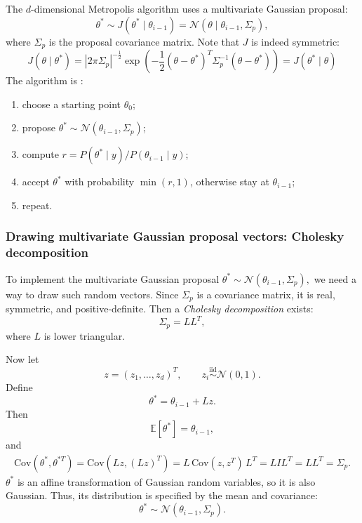\documentclass[11pt, titlepage]{article} %
\numberwithin{equation}{section}
\theoremstyle{definition}
\numberwithin{assumption}{section}
\begin{document}
The \(d\)-dimensional Metropolis algorithm uses a multivariate Gaussian proposal:
\begin{equation*}
    \theta^* \sim J(\theta^*\mid\theta_{i-1})= \mathcal{N}(\theta\mid\theta_{i-1},\Sigma_p),
\end{equation*}
where $\Sigma_p$ is the proposal covariance matrix. 
Note that $J$ is indeed symmetric:
\begin{equation*}
    J(\theta\mid\theta^*)=|2\pi\Sigma_p|^{-\frac{1}{2}}\exp\left(-\frac{1}{2}(\theta-\theta^*)^T\Sigma_p^{-1}(\theta-\theta^*)\right)= J(\theta^*\mid\theta)
\end{equation*}
The algorithm is :
\begin{enumerate}
    \item choose a starting point $\theta_0$;
    \item propose $\theta^*\sim \mathcal{N}(\theta_{i-1},\Sigma_p)$;
    \item compute $r=P(\theta^*\mid y)/P(\theta_{i-1}\mid y)$;
    \item accept $\theta^*$ with probability $\min(r,1)$, otherwise stay at $\theta_{i-1}$;
    \item repeat.
\end{enumerate}


\subsubsection*{Drawing multivariate Gaussian proposal vectors: Cholesky decomposition}

To implement the multivariate Gaussian proposal
$\theta^* \sim \mathcal{N}(\theta_{i-1},\Sigma_p),$
we need a way to draw such random vectors. Since $\Sigma_p$ is a covariance matrix, it is
real, symmetric, and positive-definite. Then a \textit{Cholesky decomposition} exists:
\begin{equation*}
    \Sigma_p=LL^T,
\end{equation*}
where $L$ is lower triangular.

Now let
\begin{equation*}
    z=(z_1,\dots,z_d)^T,
    \qquad
    z_i \overset{\mathrm{iid}}{\sim} \mathcal{N}(0,1).
\end{equation*}
Define
\begin{equation*}
    \theta^*=\theta_{i-1}+Lz.
\end{equation*}
Then
\begin{equation*}
    \mathbb{E}[\theta^*]=\theta_{i-1},
\end{equation*}
and
\begin{align*}
    \mathrm{Cov}(\theta^*,\theta^{*T})
    = \mathrm{Cov}(Lz,(Lz)^T)= L\,\mathrm{Cov}(z,z^T)\,L^T= LIL^T= LL^T= \Sigma_p.
\end{align*}
$\theta^*$ is an affine transformation of Gaussian random variables, so it is also Gaussian. Thus, its distribution is specified by the mean and covariance:
\begin{equation*}
    \theta^*\sim \mathcal{N}(\theta_{i-1},\Sigma_p).
\end{equation*}
\end{document}
